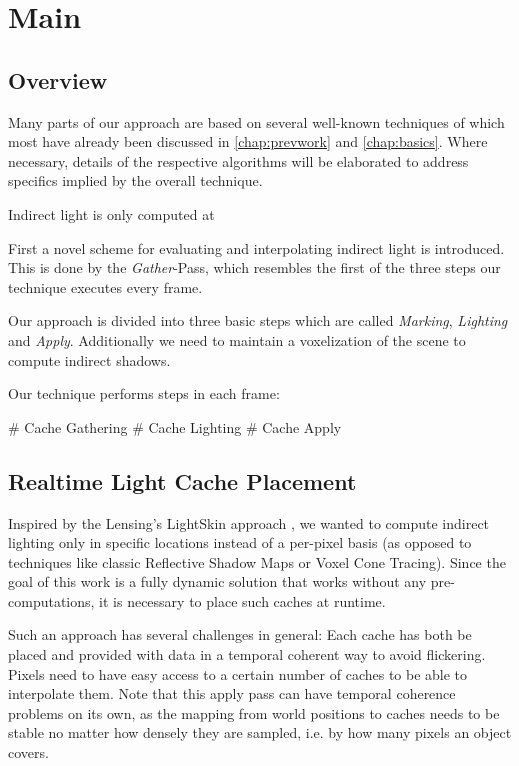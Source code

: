 \documentclass[thesis.tex]{subfiles}
\begin{document}
\chapter{Main}\label{chap:basics}

\section{Overview}

Many parts of our approach are based on several well-known techniques of which most have already been discussed in \autoref{chap:prevwork} and \autoref{chap:basics}.
Where necessary, details of the respective algorithms will be elaborated to address specifics implied by the overall technique.

Indirect light is only computed at 

First a novel scheme for evaluating and interpolating indirect light is introduced.
This is done by the \emph{Gather}-Pass, which resembles the first of the three steps our technique executes every frame.

Our approach is divided into three basic steps which are called \emph{Marking}, \emph{Lighting} and \emph{Apply}.
Additionally we need to maintain a voxelization of the scene to compute indirect shadows. 


Our technique performs steps in each frame:
\begin{easylist}[itemize]
# Cache Gathering
# Cache Lighting
# Cache Apply
\end{easylist}


\section{Realtime Light Cache Placement}

Inspired by the Lensing's LightSkin approach \cite{bib:LightskinPaper}, we wanted to compute indirect lighting only in specific locations instead of a per-pixel basis (as opposed to techniques like classic Reflective Shadow Maps or Voxel Cone Tracing).
Since the goal of this work is a fully dynamic solution that works without any pre-computations, it is necessary to place such caches at runtime.

Such an approach has several challenges in general:
Each cache has both be placed and provided with data in a temporal coherent way to avoid flickering.
Pixels need to have easy access to a certain number of caches to be able to interpolate them.
Note that this apply pass can have temporal coherence problems on its own, as the mapping from world positions to caches needs to be stable no matter how densely they are sampled, i.e. by how many pixels an object covers.
\end{document}
